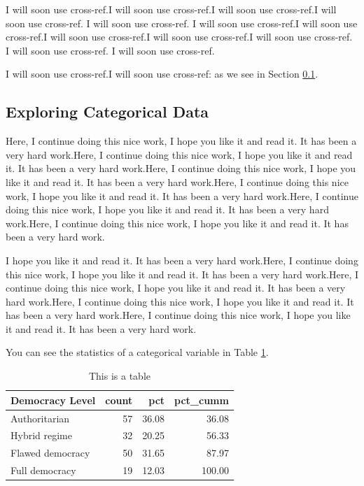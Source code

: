 \documentclass[a4paper, 12pt]{article}
\begin{document}
I will soon use cross-ref.I will soon use cross-ref.I will soon use cross-ref.I will soon use cross-ref. I will soon use cross-ref. I will soon use cross-ref.I will soon use cross-ref.I will soon use cross-ref.I will soon use cross-ref.I will soon use cross-ref. I will soon use cross-ref. I will soon use cross-ref.

I will soon use cross-ref.I will soon use cross-ref: as we see in Section \ref{catexplor}.



\subsection{Exploring Categorical Data}\label{catexplor}

Here, I continue doing this nice work, I hope you like it and read it. It has been a very hard work.Here, I continue doing this nice work, I hope you like it and read it. It has been a very hard work.Here, I continue doing this nice work, I hope you like it and read it. It has been a very hard work.Here, I continue doing this nice work, I hope you like it and read it. It has been a very hard work.Here, I continue doing this nice work, I hope you like it and read it. It has been a very hard work.Here, I continue doing this nice work, I hope you like it and read it. It has been a very hard work.

I hope you like it and read it. It has been a very hard work.Here, I continue doing this nice work, I hope you like it and read it. It has been a very hard work.Here, I continue doing this nice work, I hope you like it and read it. It has been a very hard work.Here, I continue doing this nice work, I hope you like it and read it. It has been a very hard work.Here, I continue doing this nice work, I hope you like it and read it. It has been a very hard work.

You can see the statistics of a categorical variable in Table \ref{catexploreTable}.


\begin{table}[!h]
\centering
\caption{This is a table\label{catexploreTable}}
\centering
\begin{tabular}[t]{l|r|r|r}
\hline
Democracy Level & count & pct & pct\_cumm\\
\hline
Authoritarian & 57 & 36.08 & 36.08\\
\hline
Hybrid regime & 32 & 20.25 & 56.33\\
\hline
Flawed democracy & 50 & 31.65 & 87.97\\
\hline
Full democracy & 19 & 12.03 & 100.00\\
\hline
\end{tabular}
\end{table}
\end{document}
